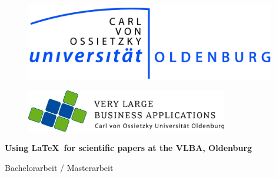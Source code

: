 \documentclass[11pt]{scrartcl}
\begin{document}
	

\begin{titlepage}
	\begin{centering}
		\begin{figure}[h!]
			\centering
			\includegraphics[width=310pt]{UOL-Logo}    
		 \end{figure}

		\vspace*{-0.8cm}

		\begin{figure}[h!]
		    \centering
		    \includegraphics[width=250pt]{VLBA-Logo}    
		\end{figure}

		\vspace*{0.4cm}
  
		\textsf{\Huge \textbf{Using \LaTeX\ for scientific papers at the VLBA, Oldenburg\\}}

		\vspace*{0.5cm}
		\noindent Bachelorarbeit / Masterarbeit

	\end{centering}
  
    \vspace*{1.5cm}
    

\end{titlepage}
\end{document}
